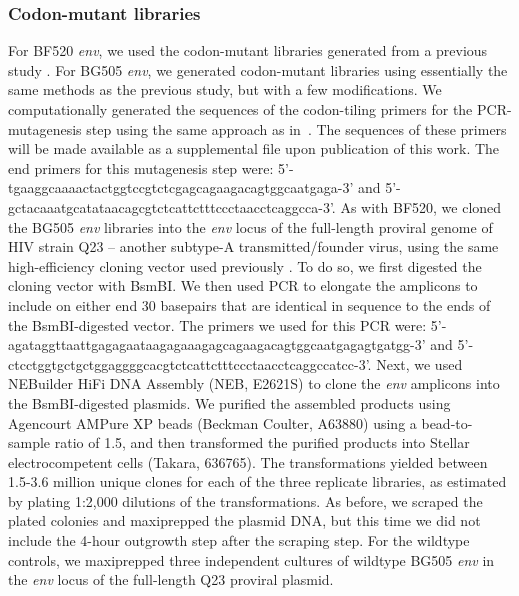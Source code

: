 \documentclass[9pt]{elife}
\begin{document}
\subsubsection*{Codon-mutant libraries}
For BF520 \textit{env}, we used the codon-mutant libraries generated from a previous study \cite{dingens2017comprehensive}.
For BG505 \textit{env}, we generated codon-mutant libraries using essentially the same methods as the previous study, but with a few modifications.
We computationally generated the sequences of the codon-tiling primers for the PCR-mutagenesis step using the same approach as in~\cite{dingens2017comprehensive}.
The sequences of these primers will be made available as a supplemental file upon publication of this work.
The end primers for this mutagenesis step were: 5'-tgaaggcaaaactactggtccgtctcgagcagaagacagtggcaatgaga-3' and 5'-gctacaaatgcatataacagcgtctcattctttccctaacctcaggcca-3'.
As with BF520, we cloned the BG505 \textit{env} libraries into the \textit{env} locus of the full-length proviral genome of HIV strain Q23 \cite{poss1999variants} -- another subtype-A transmitted/founder virus, using the same high-efficiency cloning vector used previously \cite{dingens2017comprehensive}.
To do so, we first digested the cloning vector with BsmBI.
We then used PCR to elongate the amplicons to include on either end 30 basepairs that are identical in sequence to the ends of the BsmBI-digested vector.
The primers we used for this PCR were:
5'-agataggttaattgagagaataagagaaagagcagaagacagtggcaatgagagtgatgg-3' and 5'-ctcctggtgctgctggaggggcacgtctcattctttccctaacctcaggccatcc-3'.
Next, we used NEBuilder HiFi DNA Assembly (NEB, E2621S) to clone the \textit{env} amplicons into the BsmBI-digested plasmids.
We purified the assembled products using Agencourt AMPure XP beads (Beckman Coulter, A63880) using a bead-to-sample ratio of 1.5, and then transformed the purified products into Stellar electrocompetent cells (Takara, 636765).
The transformations yielded between 1.5-3.6 million unique clones for each of the three replicate libraries, as estimated by plating 1:2,000 dilutions of the transformations.
As before, we scraped the plated colonies and maxiprepped the plasmid DNA, but this time we did not include the 4-hour outgrowth step after the scraping step.
For the wildtype controls, we maxiprepped three independent cultures of wildtype BG505 \textit{env} in the \textit{env} locus of the full-length Q23 proviral plasmid.
\end{document}
